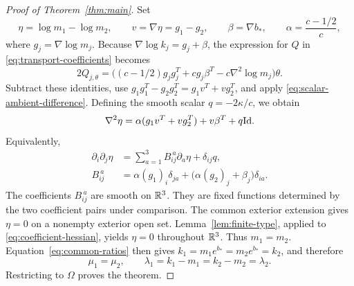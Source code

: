 \begin{proof}[Proof of Theorem~\ref{thm:main}]
Set
\[
 \eta=\log m_1-\log m_2,\qquad v=\nabla\eta=g_1-g_2,
 \qquad \beta=\nabla b_*,\qquad \alpha=\frac{c-1/2}{c},
\]
where $g_j=\nabla\log m_j$.  Because
$\nabla\log k_j=g_j+\beta$, the expression for $Q$ in
\eqref{eq:transport-coefficients} becomes
\[
 2Q_{j,\theta}
   =\bigl((c-1/2)g_jg_j^T+c g_j\beta^T
                 -c\nabla^2\log m_j\bigr)\theta.
\]
Subtract these identities, use
$g_1g_1^T-g_2g_2^T=g_1v^T+vg_2^T$, and apply
\eqref{eq:scalar-ambient-difference}.  Defining the smooth scalar
$q=-2\kappa/c$, we obtain
\[
 \nabla^2\eta
    =\alpha(g_1v^T+vg_2^T)+v\beta^T+q\mathrm{Id}.
\]
Equivalently,
\begin{equation}\label{eq:coefficient-hessian}
 \begin{aligned}
 \partial_i\partial_j\eta
   &=\sum_{a=1}^3 B_{ij}^{\ a}\partial_a\eta+\delta_{ij}q,\\
 B_{ij}^{\ a}
   &=\alpha(g_1)_i\delta_{ja}
        +\bigl(\alpha(g_2)_j+\beta_j\bigr)\delta_{ia}.
 \end{aligned}
\end{equation}
The coefficients $B_{ij}^{\ a}$ are smooth on $\mathbb R^3$.  They are fixed
functions determined by the two coefficient pairs under comparison.
The common exterior extension gives $\eta=0$ on a nonempty exterior open
set.  Lemma~\ref{lem:finite-type}, applied to
\eqref{eq:coefficient-hessian}, yields $\eta=0$ throughout $\mathbb R^3$.
Thus $m_1=m_2$.  Equation~\eqref{eq:common-ratios} then gives
$k_1=m_1e^{b_*}=m_2e^{b_*}=k_2$, and therefore
\[
 \mu_1=\mu_2,\qquad
 \lambda_1=k_1-m_1=k_2-m_2=\lambda_2.
\]
Restricting to $\Omega$ proves the theorem.
\end{proof}
